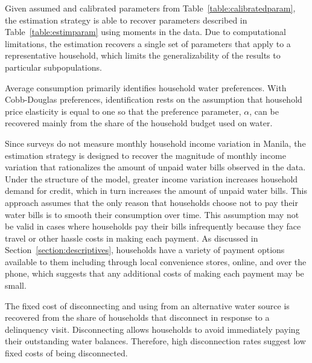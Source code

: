 \documentclass[12pt]{article}
\begin{document}

Given assumed and calibrated parameters from Table~\ref{table:calibratedparam}, the estimation strategy is able to recover parameters described in Table~\ref{table:estimparam} using moments in the data.  Due to computational limitations, the estimation recovers a single set of parameters that apply to a representative household, which limits the generalizability of the results to particular subpopulations.  

Average consumption primarily identifies household water preferences.  With Cobb-Douglas preferences, identification rests on the assumption that household price elasticity is equal to one so that the preference parameter, $\alpha$, can be recovered mainly from the share of the household budget used on water.

Since surveys do not measure monthly household income variation in Manila, the estimation strategy is designed to recover the magnitude of monthly income variation that rationalizes the amount of unpaid water bills observed in the data.  Under the structure of the model, greater income variation increases household demand for credit, which in turn increases the amount of unpaid water bills.  This approach assumes that the only reason that households choose not to pay their water bills is to smooth their consumption over time.  This assumption may not be valid in cases where households pay their bills infrequently because they face travel or other hassle costs in making each payment.  As discussed in Section~\ref{section:descriptives}, households have a variety of payment options available to them including through local convenience stores, online, and over the phone, which suggests that any additional costs of making each payment may be small. %

The fixed cost of disconnecting and using from an alternative water source is recovered from the share of households that disconnect in response to a delinquency visit.  Disconnecting allows households to avoid immediately paying their outstanding water balances.  Therefore, high disconnection rates suggest low fixed costs of being disconnected.
\end{document}

